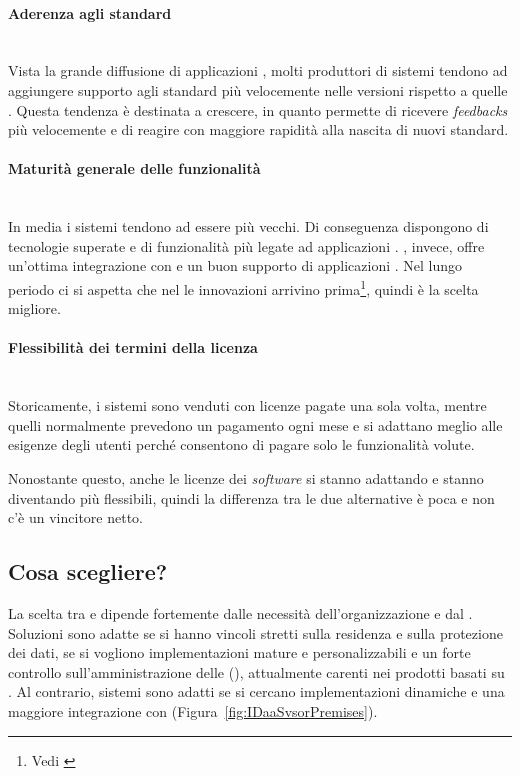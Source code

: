 \paragraph{Aderenza agli standard} \mbox{} \\
Vista la grande diffusione di applicazioni , molti produttori di sistemi  tendono ad aggiungere supporto agli standard più velocemente nelle versioni  rispetto a quelle . Questa tendenza è destinata a crescere, in quanto permette di ricevere \textit{feedbacks} più velocemente e di reagire con maggiore rapidità alla nascita di nuovi standard.

\paragraph{Maturità generale delle funzionalità} \mbox{} \\
In media i sistemi  tendono ad essere più vecchi. Di conseguenza dispongono di tecnologie superate e di funzionalità più legate ad applicazioni . , invece, offre un'ottima integrazione con  e un buon supporto di applicazioni . Nel lungo periodo ci si aspetta che nel  le innovazioni arrivino prima\footnote{Vedi \cite{grt:G00261583}}, quindi  è la scelta migliore.

\paragraph{Flessibilità dei termini della licenza} \mbox{} \\
Storicamente, i sistemi  sono venduti con licenze pagate una sola volta, mentre quelli  normalmente prevedono un pagamento ogni mese e si adattano meglio alle esigenze degli utenti perché consentono di pagare solo le funzionalità volute. 

Nonostante questo, anche le licenze dei \textit{software}  si stanno adattando e stanno diventando più flessibili, quindi la differenza tra le due alternative è poca e non c'è un vincitore netto.

\subsection{Cosa scegliere?}
La scelta tra  e  dipende fortemente dalle necessità dell'organizzazione e dal . Soluzioni  sono adatte se si hanno vincoli stretti sulla residenza e sulla protezione dei dati, se si vogliono implementazioni  mature e personalizzabili e un forte controllo sull'amministrazione delle  (), attualmente carenti nei prodotti basati su . Al contrario, sistemi  sono adatti se si cercano implementazioni  dinamiche e una maggiore integrazione con  (Figura~\ref{fig:IDaaSvsorPremises}).

